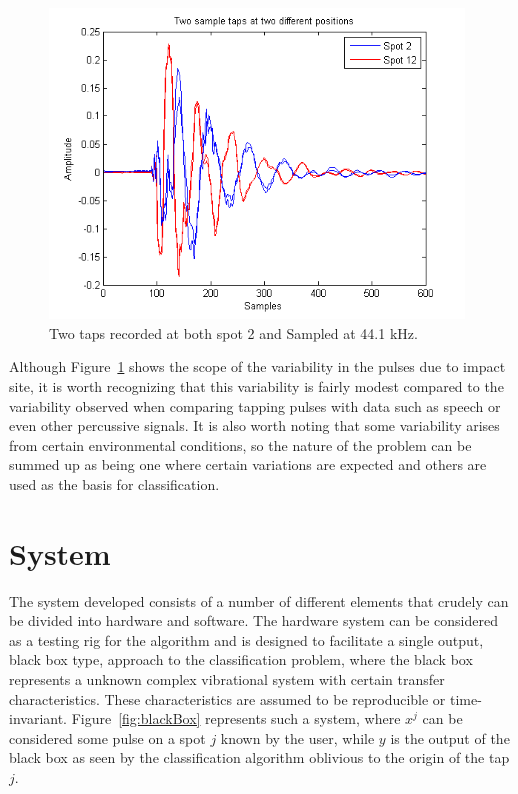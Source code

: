 \begin{figure}[t]
  \begin{center}
    \includegraphics[width=110mm]{twotwoSampleTap}
    \caption{Two taps recorded at both spot 2 and \DIFdelbeginFL {}\DIFdelendFL \DIFaddbeginFL {}\DIFaddendFL Sampled at 44.1 kHz.}\label{fig:twotwoSampleTap}
  \end{center}
\end{figure}

Although Figure~\ref{fig:twotwoSampleTap} shows the scope of the variability in the pulses due to impact site, it is worth recognizing that this variability is fairly modest compared to the variability observed when comparing tapping pulses with data such as speech or even other percussive signals. It is also worth noting that some variability arises from certain environmental conditions, so the nature of the problem can be summed up as being one where certain variations are expected and others are used as the basis for classification.

\section{System}\label{sec:APRsystem}
The system developed consists of a number of different elements that crudely can be divided into hardware and software. The hardware system can be considered as a testing rig for the algorithm and is designed to facilitate a single output, black box type, approach to the classification problem, where the black box represents a unknown complex vibrational system with certain transfer characteristics. These characteristics are assumed to be reproducible or time-invariant. Figure~\ref{fig:blackBox} represents such a system, where $x^j$ can be considered some pulse on a spot $j$ known by the user, while $y$ is the output of the black box as seen by the classification algorithm oblivious to the origin of the tap $j$.

